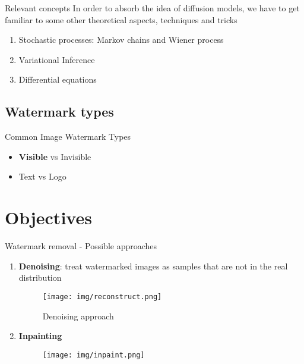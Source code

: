 \begin{frame}{Relevant concepts}
    In order to absorb the idea of diffusion models, we have to get familiar to some other theoretical aspects, techniques and tricks
    \begin{enumerate}
        \item Stochastic processes: Markov chains and Wiener process      
        \item Variational Inference
        \item Differential equations
    \end{enumerate}
\end{frame}

\subsection{Watermark types}

\begin{frame}{Common Image Watermark Types}
\begin{itemize}
    \item \textbf{Visible} vs Invisible
    \item Text vs Logo
\end{itemize}
\end{frame}

\section{Objectives}

\begin{frame}{Watermark removal - Possible approaches}

\begin{enumerate}
    \item \textbf{Denoising}: treat watermarked images as samples that are not in the real distribution 

    \begin{figure}
        \centering
        \texttt{[image: img/reconstruct.png]}
        \caption{Denoising approach \cite{mousakhan2023anomaly}}
        \label{fig:enter-label}
    \end{figure}
    
    \item \textbf{Inpainting}
    \begin{figure}
        \centering
        \texttt{[image: img/inpaint.png]}
        \label{fig:enter-label}
    \end{figure}
    
\end{enumerate}
\end{frame}

